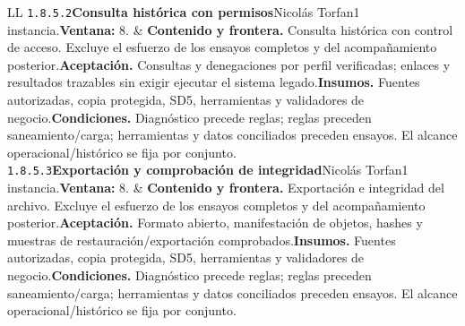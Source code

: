 \begin{longtable}{L{\tabcolsep\relax}L{\tabcolsep\relax}}
\texttt{1.\allowbreak{}8.\allowbreak{}5.\allowbreak{}2}\newline{}\textbf{Consulta histórica con permisos}\newline{}Nicolás Torfan\newline{}1 instancia.\newline{}\textbf{Ventana:} 8. & \textbf{Contenido y frontera.} Consulta histórica con control de acceso. Excluye el esfuerzo de los ensayos completos y del acompañamiento posterior.\newline{}\textbf{Aceptación.} Consultas y denegaciones por perfil verificadas; enlaces y resultados trazables sin exigir ejecutar el sistema legado.\newline{}\textbf{Insumos.} Fuentes autorizadas, copia protegida, SD5, herramientas y validadores de negocio.\newline{}\textbf{Condiciones.} Diagnóstico precede reglas; reglas preceden saneamiento/carga; herramientas y datos conciliados preceden ensayos. El alcance operacional/histórico se fija por conjunto.\\\hline
\texttt{1.\allowbreak{}8.\allowbreak{}5.\allowbreak{}3}\newline{}\textbf{Exportación y comprobación de integridad}\newline{}Nicolás Torfan\newline{}1 instancia.\newline{}\textbf{Ventana:} 8. & \textbf{Contenido y frontera.} Exportación e integridad del archivo. Excluye el esfuerzo de los ensayos completos y del acompañamiento posterior.\newline{}\textbf{Aceptación.} Formato abierto, manifestación de objetos, hashes y muestras de restauración/exportación comprobados.\newline{}\textbf{Insumos.} Fuentes autorizadas, copia protegida, SD5, herramientas y validadores de negocio.\newline{}\textbf{Condiciones.} Diagnóstico precede reglas; reglas preceden saneamiento/carga; herramientas y datos conciliados preceden ensayos. El alcance operacional/histórico se fija por conjunto.\\\hline

\end{longtable}
